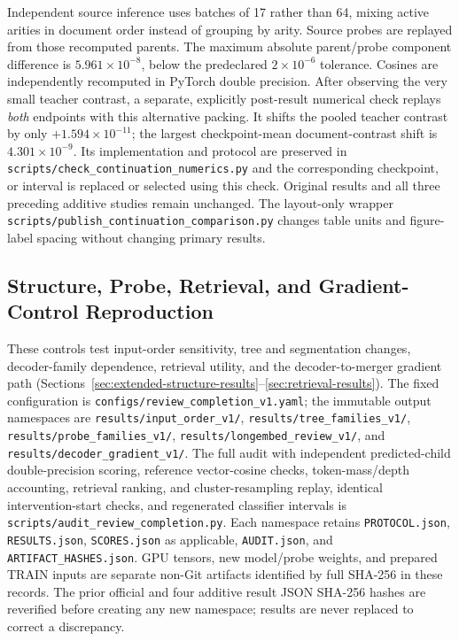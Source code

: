 \documentclass[10pt]{article}
\begin{document}
Independent source inference uses batches of 17 rather than 64, mixing active
arities in document order instead of grouping by arity. Source probes are
replayed from those recomputed parents. The maximum absolute parent/probe
component difference is \(5.961\times10^{-8}\), below the predeclared
\(2\times10^{-6}\) tolerance. Cosines are independently recomputed in PyTorch
double precision. After observing the very small teacher contrast, a separate,
explicitly post-result numerical check replays \emph{both} endpoints with this
alternative packing. It shifts the pooled teacher contrast by only
\(+1.594\times10^{-11}\); the largest checkpoint-mean document-contrast
shift is \(4.301\times10^{-9}\). Its implementation and protocol are preserved
in \nolinkurl{scripts/check_continuation_numerics.py} and the corresponding
checkpoint, or interval is replaced or selected using this check. Original
results and all three preceding additive studies remain unchanged. The
layout-only wrapper \nolinkurl{scripts/publish_continuation_comparison.py}
changes table units and figure-label spacing without changing primary results.

\subsection{Structure, Probe, Retrieval, and Gradient-Control Reproduction}
\label{app:extended-review}

These controls test input-order sensitivity, tree and segmentation changes,
decoder-family dependence, retrieval utility, and the decoder-to-merger
gradient path (Sections~\ref{sec:extended-structure-results}--\ref{sec:retrieval-results}).
The fixed configuration is
\nolinkurl{configs/review_completion_v1.yaml}; the immutable output namespaces
are \nolinkurl{results/input_order_v1/},
\nolinkurl{results/tree_families_v1/},
\nolinkurl{results/probe_families_v1/},
\nolinkurl{results/longembed_review_v1/}, and
\nolinkurl{results/decoder_gradient_v1/}. The full audit with independent
predicted-child double-precision scoring, reference vector-cosine checks,
token-mass/depth accounting, retrieval ranking, and cluster-resampling replay,
identical intervention-start checks, and regenerated classifier intervals is
\nolinkurl{scripts/audit_review_completion.py}. Each namespace retains
\texttt{PROTOCOL.json}, \texttt{RESULTS.json}, \texttt{SCORES.json} as applicable,
\texttt{AUDIT.json}, and \texttt{ARTIFACT\_HASHES.json}. GPU tensors, new
model/probe weights, and prepared TRAIN inputs are separate non-Git artifacts
identified by full SHA-256 in these records. The prior official and four
additive result JSON SHA-256 hashes are reverified before creating any new
namespace; results are never replaced to correct a discrepancy.
\end{document}
